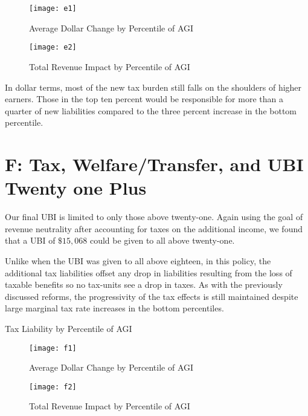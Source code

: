 \documentclass{article}
\begin{document}
\begin{figure}[H]
\centering
\caption{Average Dollar Change by Percentile of AGI}
\texttt{[image: e1]}
\end{figure}

\begin{figure}[H]
\centering
\caption{Total Revenue Impact by Percentile of AGI}
\texttt{[image: e2]}
\end{figure}

In dollar terms, most of the new tax burden still falls on the shoulders of higher earners. Those in the top ten percent would be responsible for more than a quarter of new liabilities compared to the three percent increase in the bottom percentile.

\section{F: Tax, Welfare/Transfer, and UBI Twenty one Plus}
Our final UBI is limited to only those above twenty-one. Again using the goal of revenue neutrality after accounting for taxes on the additional income, we found that a UBI of $\$15,068$ could be given to all above twenty-one. 

Unlike when the UBI was given to all above eighteen, in this policy, the additional tax liabilities offset any drop in liabilities resulting from the loss of taxable benefits so no tax-units see a drop in taxes. As with the previously discussed reforms, the progressivity of the tax effects is still maintained despite large marginal tax rate increases in the bottom percentiles.

\begin{table}[H]
\caption{Tax Liability by Percentile of AGI}

\begin{center}
\begin{adjustbox}{max width=\textwidth}

\end{adjustbox}
\end{center}
\end{table}

\begin{figure}[H]
\centering
\caption{Average Dollar Change by Percentile of AGI}
\texttt{[image: f1]}
\end{figure}

\begin{figure}[H]
\centering
\caption{Total Revenue Impact by Percentile of AGI}
\texttt{[image: f2]}
\end{figure}
\end{document}
